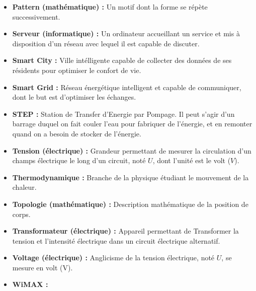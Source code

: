\begin{itemize}
    \item \textbf{Pattern (mathématique) :} Un motif dont la forme se répète successivement.
    \item \textbf{Serveur (informatique) :} Un ordinateur accueillant un service et mis à disposition d'un réseau avec lequel il est capable de discuter.
    \item \textbf{Smart City :} Ville intélligente capable de collecter des données de ses résidents pour optimiser le confort de vie.
    \item \textbf{Smart Grid :} Réseau énergétique intelligent et capable de communiquer, dont le but est d'optimiser les échanges.
    \item \textbf{STEP :} Station de Transfer d'Energie par Pompage.
Il peut s'agir d'un barrage duquel on fait couler l'eau pour fabriquer de l'énergie, et en remonter quand on a besoin de stocker de l'énergie.
    \item \textbf{Tension (électrique) :} Grandeur permettant de mesurer la circulation d'un champs électrique le long d'un circuit, noté $U$, dont l'unité est le volt ($V$).
    \item \textbf{Thermodynamique :} Branche de la physique étudiant le mouvement de la chaleur.
    \item \textbf{Topologie (mathématique) :} Description mathématique de la position de corps.
    \item \textbf{Transformateur (électrique) :} Appareil permettant de Transformer la tension et l'intensité électrique dans un circuit électrique alternatif.
    \item \textbf{Voltage (électrique) :} Anglicisme de la tension électrique, noté $U$, se mesure en volt (V).
    \item \textbf{WiMAX :}
\end{itemize}